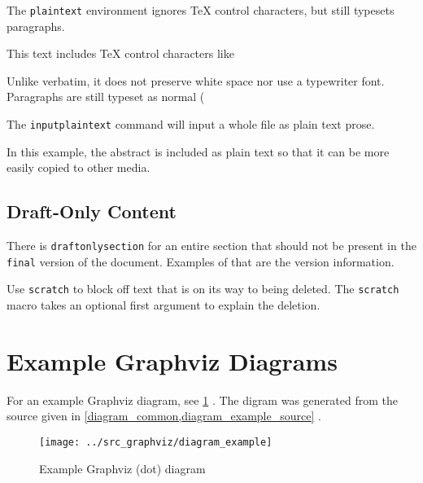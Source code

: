 The \lstinline{plaintext} environment ignores TeX control characters,
but still typesets paragraphs.

\begin{plaintext}
    This text includes TeX control characters like %

    Unlike verbatim, it does not preserve white space nor use a typewriter font.
    Paragraphs are still
    typeset as normal (%
\end{plaintext}

The \lstinline{inputplaintext} command will input a whole file as plain text prose.

In this example, the abstract is included as plain text so that it can be more easily copied to other media.



\subsection{Draft-Only Content}

There is \lstinline{draftonlysection} for an entire section that should not be present in the \lstinline{final} version of the document.
Examples of that are the version information.

Use \lstinline{scratch} to block off text that is on its way to being deleted.
The \lstinline{scratch} macro takes an optional first argument to explain the deletion.




\section{Example Graphviz Diagrams}

For an example Graphviz diagram, see
\cref{diagram_example}%
.
The digram was generated from the source given in
\cref{diagram_common,diagram_example_source}%
.

\begin{figure}[h]
    \centering
    \texttt{[image: ../src\_graphviz/diagram\_example]}
    \caption{Example Graphviz (dot) diagram}
    \label{diagram_example}
\end{figure}

